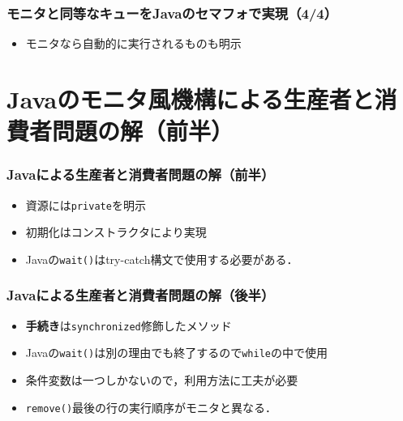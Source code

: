 \documentclass[dvipdfmx]{beamer}
\begin{document}
\begin{frame}
  \frametitle{モニタと同等なキューをJavaのセマフォで実現（4/4）}
  

  \begin{itemize}
  \item モニタなら自動的に実行されるものも明示
  \end{itemize}
\end{frame}

\section{Javaのモニタ風機構による生産者と消費者問題の解（前半）}
\begin{frame}
  \frametitle{Javaによる生産者と消費者問題の解（前半）}
  

  \begin{itemize}
  \item 資源には{\tt private}を明示
  \item 初期化はコンストラクタにより実現
  \item Javaの{\tt wait()}はtry-catch構文で使用する必要がある．
  \end{itemize}
\end{frame}

\begin{frame}
  \frametitle{Javaによる生産者と消費者問題の解（後半）}
  

  \begin{itemize}
  \item {\bf 手続き}は{\tt synchronized}修飾したメソッド
  \item Javaの{\tt wait()}は別の理由でも終了するので{\tt while}の中で使用
  \item 条件変数は一つしかないので，利用方法に工夫が必要
  \item {\tt remove()}最後の行の実行順序がモニタと異なる．
  \end{itemize}
\end{frame}
\end{document}
